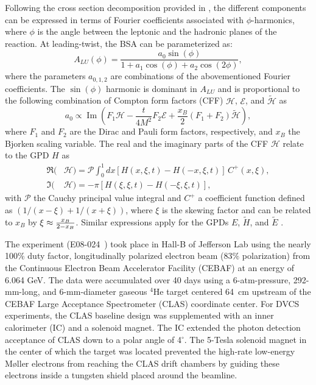 \documentclass[twocolumn,nofootinbib,prl,superscriptaddress,secnumarabic,amssymb,nobibnotes,aps,floatfix]{revtex4}
\begin{document}
Following the cross section decomposition provided in \cite{Belitsky:2001ns}, 
the different components can be expressed in terms of Fourier coefficients 
associated with $\phi$-harmonics, where $\phi$ is the angle between the 
leptonic and the hadronic planes of the reaction. At leading-twist, the BSA can 
be parameterized as: 
\begin{equation}
   A_{LU}(\phi) = \frac{a_{0}\sin(\phi)}{1+a_{1}\cos(\phi)+a_{2}\cos(2\phi)},
   \label{eq:alu-simp}
\end{equation}
where the parameters $a_{0,1,2}$ are combinations of the abovementioned Fourier 
coefficients. The $\sin(\phi)$ harmonic is dominant in $A_{LU}$ and is 
proportional to the following combination of Compton form factors (CFF) 
$\mathcal{H}$, $\mathcal{E}$, and $\tilde{\mathcal{H}}$ as  
\cite{Guidal:2013rya}
\begin{equation}
   a_{0} \propto \operatorname{Im}( F_1 \mathcal{H}- \frac{t}{4M^2} F_2 
   \mathcal{E}+ \frac{x_B}{2}(F_1+F_2)\tilde{\mathcal{H}}),
\end{equation}
where $F_1$ and $F_2$ are the Dirac and Pauli form factors, respectively, and 
$x_B$ the Bjorken scaling variable. The real and the imaginary parts of the CFF 
$\mathcal{H}$ relate to the GPD $H$ as  \begin{align}
   \Re(&\mathcal{H}) = \mathcal{P} \int_{0}^{1}dx[H(x,\xi,t)-H(-x,\xi,t)] \, 
   C^{+}(x,\xi), \\
   \Im(&\mathcal{H}) = - \pi [H(\xi,\xi,t)-H(-\xi,\xi,t)],
\end{align}
with $\mathcal{P}$ the Cauchy principal value integral and $C^{+}$ a 
coefficient function defined as $(1/(x-\xi) + 1/(x+\xi))$, where $\xi$ is the 
skewing factor and can be related to $x_B$ by $\xi\approx {{x_B}\over{2-x_B}}$.  
Similar expressions apply for the GPDs $E$, $\widetilde{H}$, and 
$\widetilde{E}$ \cite{Guidal:2013rya}.


The experiment (E08-024~\cite{Hafidi:2008pr}) took place in Hall-B of Jefferson 
Lab using the nearly 100\% duty factor, longitudinally polarized electron beam 
(83$\%$ polarization) from the Continuous Electron Beam Accelerator Facility 
(CEBAF) at an energy of 6.064 GeV. The data were accumulated over 40 days using 
a 6-atm-pressure, 292-mm-long, and 6-mm-diameter gaseous $^4$He target centered 
64~cm upstream of the CEBAF Large Acceptance Spectrometer (CLAS) coordinate 
center. For DVCS experiments, the CLAS baseline design \cite{Mecking:2003zu} 
was supplemented with an inner calorimeter (IC) and a solenoid magnet. The IC 
extended the photon detection acceptance of CLAS down to a polar angle of 
4$^{\circ}$. The 5-Tesla solenoid magnet in the center of which the target was 
located prevented the high-rate low-energy M{\o}ller electrons from reaching 
the CLAS drift chambers by guiding these electrons inside a tungsten shield 
placed around the beamline. 
\end{document}

